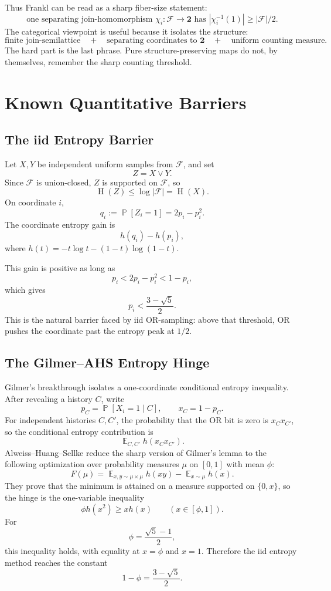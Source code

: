 \documentclass[11pt]{article}
\DeclareMathOperator{\Ent}{H}
\DeclareMathOperator{\E}{\mathbb{E}}
\DeclareMathOperator{\Prb}{\mathbb{P}}
\begin{document}
Thus Frankl can be read as a sharp fiber-size statement:
\[
  \text{one separating join-homomorphism }
  \chi_i : \mathcal{F} \to \mathbf{2}
  \text{ has }
  |\chi_i^{-1}(1)| \geq |\mathcal{F}|/2.
\]
The categorical viewpoint is useful because it isolates the structure:
\[
  \text{finite join-semilattice}
  \quad + \quad
  \text{separating coordinates to } \mathbf{2}
  \quad + \quad
  \text{uniform counting measure}.
\]
The hard part is the last phrase.  Pure structure-preserving maps do not, by
themselves, remember the sharp counting threshold.

\section{Known Quantitative Barriers}

\subsection{The iid Entropy Barrier}

Let $X,Y$ be independent uniform samples from $\mathcal{F}$, and set
\[
  Z = X \vee Y.
\]
Since $\mathcal{F}$ is union-closed, $Z$ is supported on $\mathcal{F}$, so
\[
  \Ent(Z) \leq \log |\mathcal{F}| = \Ent(X).
\]
On coordinate $i$,
\[
  q_i := \Prb[Z_i = 1] = 2p_i - p_i^2.
\]
The coordinate entropy gain is
\[
  h(q_i) - h(p_i),
\]
where $h(t)=-t\log t-(1-t)\log(1-t)$.

This gain is positive as long as
\[
  p_i < 2p_i - p_i^2 < 1-p_i,
\]
which gives
\[
  p_i < \frac{3-\sqrt{5}}{2}.
\]
This is the natural barrier faced by iid OR-sampling: above that threshold,
OR pushes the coordinate past the entropy peak at $1/2$.

\subsection{The Gilmer--AHS Entropy Hinge}

Gilmer's breakthrough isolates a one-coordinate conditional entropy
inequality.  After revealing a history $C$, write
\[
  p_C=\Prb[X_i=1\mid C],
  \qquad
  x_C=1-p_C.
\]
For independent histories $C,C'$, the probability that the OR bit is zero is
$x_Cx_{C'}$, so the conditional entropy contribution is
\[
  \E_{C,C'} h(x_Cx_{C'}).
\]
Alweiss--Huang--Sellke reduce the sharp version of Gilmer's lemma to the
following optimization over probability measures $\mu$ on $[0,1]$ with mean
$\phi$:
\[
  F(\mu)=\E_{x,y\sim\mu\times\mu} h(xy)-\E_{x\sim\mu}h(x).
\]
They prove that the minimum is attained on a measure supported on
$\{0,x\}$, so the hinge is the one-variable inequality
\[
  \phi h(x^2)\ge xh(x)\qquad (x\in[\phi,1]).
\]
For
\[
  \phi=\frac{\sqrt5-1}{2},
\]
this inequality holds, with equality at $x=\phi$ and $x=1$.  Therefore the
iid entropy method reaches the constant
\[
  1-\phi=\frac{3-\sqrt5}{2}.
\]
\end{document}
